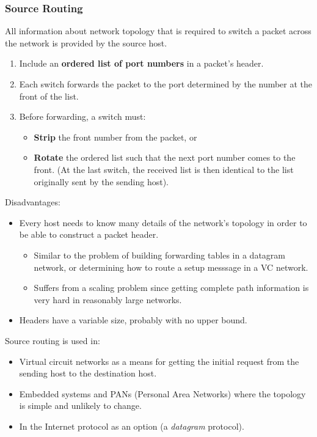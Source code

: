 \documentclass{article}%
\begin{document}
\subsubsection{Source Routing}
\label{sec:org1cb87b4}
All information about network topology that is required to switch a packet across the network is provided by the source host.
\begin{enumerate}
\item Include an \textbf{ordered list of port numbers} in a packet's header.
\item Each switch forwards the packet to the port determined by the number at the front of the list.
\item Before forwarding, a switch must:
\begin{itemize}
\item \textbf{Strip} the front number from the packet, or
\item \textbf{Rotate} the ordered list such that the next port number comes to the front. (At the last switch, the received list is then identical to the list originally sent by the sending host).
\end{itemize}
\end{enumerate}
Disadvantages:
\begin{itemize}
\item Every host needs to know many details of the network's topology in order to be able to construct a packet header.
\begin{itemize}
\item Similar to the problem of building forwarding tables in a datagram network, or determining how to route a setup messsage in a VC network.
\item Suffers from a scaling problem since getting complete path information is very hard in reasonably large networks.
\end{itemize}
\item Headers have a variable size, probably with no upper bound.
\end{itemize}
Source routing is used in:
\begin{itemize}
\item Virtual circuit networks as a means for getting the initial request from the sending host to the destination host.
\item Embedded systems and PANs (Personal Area Networks) where the topology is simple and unlikely to change.
\item In the Internet protocol as an option (a \emph{datagram} protocol).
\end{itemize}
\end{document}
